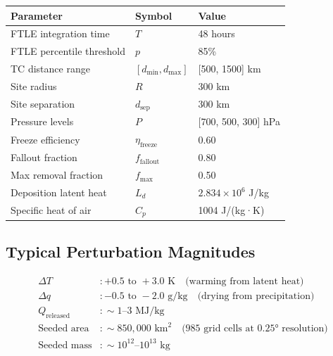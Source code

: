 \documentclass{article}
\begin{document}
\begin{table}[h]
\centering
\begin{tabular}{lll}
\hline
\textbf{Parameter} & \textbf{Symbol} & \textbf{Value} \\
\hline
FTLE integration time & $T$ & 48 hours \\
FTLE percentile threshold & $p$ & 85\% \\
TC distance range & $[d_{\min}, d_{\max}]$ & [500, 1500] km \\
Site radius & $R$ & 300 km \\
Site separation & $d_{\text{sep}}$ & 300 km \\
Pressure levels & $P$ & [700, 500, 300] hPa \\
Freeze efficiency & $\eta_{\text{freeze}}$ & 0.60 \\
Fallout fraction & $f_{\text{fallout}}$ & 0.80 \\
Max removal fraction & $f_{\max}$ & 0.50 \\
Deposition latent heat & $L_d$ & $2.834 \times 10^6$ J/kg \\
Specific heat of air & $C_p$ & 1004 J/(kg·K) \\
\hline
\end{tabular}
\end{table}

\subsection*{Typical Perturbation Magnitudes}

\begin{align}
\Delta T &: +0.5 \text{ to } +3.0 \text{ K} \quad \text{(warming from latent heat)} \\
\Delta q &: -0.5 \text{ to } -2.0 \text{ g/kg} \quad \text{(drying from precipitation)} \\
Q_{\text{released}} &: \sim 1\text{--}3 \text{ MJ/kg} \\
\text{Seeded area} &: \sim 850{,}000 \text{ km}^2 \quad \text{(985 grid cells at 0.25° resolution)} \\
\text{Seeded mass} &: \sim 10^{12}\text{--}10^{13} \text{ kg}
\end{align}
\end{document}
